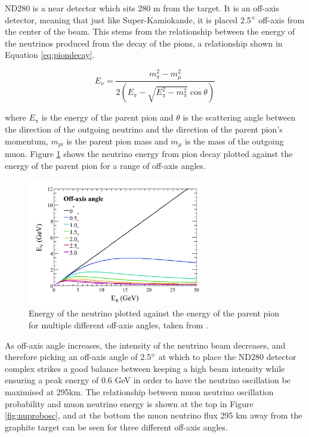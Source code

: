 ND280 is a near detector which sits 280 m from the target. It is an off-axis detector, meaning that just like Super-Kamiokande, it is placed 2.5$\degree$ off-axis from the center of the beam. This stems from the relationship between the energy of the neutrinos produced from the decay of the pions, a relationship shown in Equation \ref{eq:piondecay}. 

\begin{equation}
    E_{\nu}=\frac{m_{\pi}^{2}-m_{\mu}^{2}}{2\left(E_{\pi}-\sqrt{E_{\pi}^{2}-m_{\pi}^{2}} \cos \theta\right)}
\label{eq:piondecay}
\end{equation}

where $E_{\pi}$ is the energy of the parent pion and $\theta$ is the scattering angle between the direction of the outgoing neutrino and the direction of the parent pion's momentum, $m_{pi}$ is the parent pion mass and $m_{\mu}$ is the mass of the outgoing muon. Figure \ref{fig:energyangle} shows the neutrino energy from pion decay plotted against the energy of the parent pion for a range of off-axis angles. 

\begin{figure}
\centering
\includegraphics[width=0.7\textwidth]{Figures/energy_angle.PNG}
\caption{Energy of the neutrino plotted against the energy of the parent pion for multiple different off-axis angles, taken from \cite{t2k_collaboration_t2k_2013}.}
\label{fig:energyangle}
\end{figure}

As off-axis angle increases, the intensity of the neutrino beam decreases, and therefore picking an off-axis angle of 2.5$\degree$ at which to place the ND280 detector complex strikes a good balance between keeping a high beam intensity while ensuring a peak energy of 0.6 GeV in order to have the neutrino oscillation be maximised at 295km. The relationship between muon neutrino oscillation probability and muon neutrino energy is shown at the top in Figure \ref{fig:nuprobosc}, and at the bottom the muon neutrino flux 295 km away from the graphite target can be seen for three different off-axis angles.

